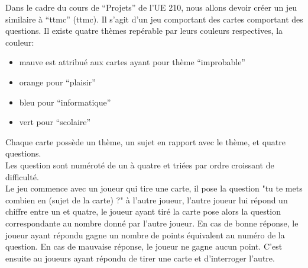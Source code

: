 Dans le cadre du cours de ``Projets'' de l'UE 210, nous allons devoir créer un jeu similaire à ``\acrlong{ttmc}'' (\acrshort{ttmc}). Il s'agit d'un jeu comportant des cartes comportant des questions. Il existe quatre thèmes repérable par leurs couleurs respectives, la couleur:
\begin{itemize}
	\item mauve est attribué aux cartes ayant pour thème ``improbable''
	\item orange pour ``plaisir''
	\item bleu pour ``informatique''
	\item vert pour ``scolaire''
\end{itemize}
Chaque carte possède un thème, un sujet en rapport avec le thème, et quatre questions.\\
Les question sont numéroté de un à quatre et triées par ordre croissant de difficulté.\\
Le jeu commence avec un joueur qui tire une carte, il pose la question "tu te mets combien en (sujet de la carte) ?" à l'autre joueur, l'autre joueur lui répond un chiffre entre un et quatre, le joueur ayant tiré la carte pose alors la question correspondante au nombre donné par l'autre joueur. En cas de bonne réponse, le joueur ayant répondu gagne un nombre de points équivalent au numéro de la question. En cas de mauvaise réponse, le joueur ne gagne aucun point. C'est ensuite au joueurs ayant répondu de tirer une carte et d'interroger l'autre.


